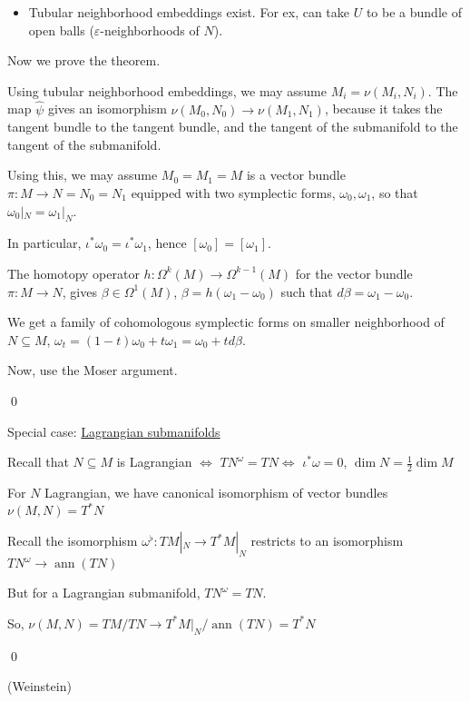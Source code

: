 \documentclass[x11names,reqno,14pt]{extarticle}
\DeclareMathOperator{\ann}{ann}
\begin{document}
\begin{itemize}

\item Tubular neighborhood embeddings exist. For ex, can take $U$ to be a bundle of open balls ($\varepsilon$-neighborhoods of $N$).

\end{itemize}

Now we prove the theorem. 

\proof

Using tubular neighborhood embeddings, we may assume $M_i = \nu(M_i,N_i)$. The map $\hat{\psi}$ gives an isomorphism $\nu(M_0,N_0) \to \nu(M_1,N_1)$, because it takes the tangent bundle to the tangent bundle, and the tangent of the submanifold to the tangent of the submanifold. 

Using this, we may assume $M_0 = M_1 = M$ is a vector bundle $\pi:M\to N = N_0 = N_1$ equipped with two symplectic forms, $\omega_0,\omega_1$, so that $\omega_0|_N = \omega_1|_N$.

In particular, $\iota^*\omega_0 = \iota^*\omega_1$, hence $[\omega_0] = [\omega_1]$. 

The homotopy operator $h:\Omega^k(M) \to \Omega^{k-1}(M)$ for the vector bundle $\pi:M\to N$, gives $\beta\in\Omega^1(M)$, $\beta = h(\omega_1-\omega_0)$ such that $d\beta = \omega_1-\omega_0$. 

We get a family of cohomologous symplectic forms on smaller neighborhood of $N\subseteq M$, $\omega_t = (1-t)\omega_0 + t\omega_1 = \omega_0 + td\beta$.

Now, use the Moser argument.

\qed

Special case: \underline{Lagrangian submanifolds}

Recall that $N \subseteq M$ is Lagrangian $\iff$ $TN^\omega = TN \iff$ $\iota^*\omega = 0$, $\dim N = \frac12\dim M$

\lem

For $N$ Lagrangian, we have canonical isomorphism of vector bundles $\nu(M,N) = T^*N$

\proof

Recall the isomorphism $\omega^\flat:TM|_N\to T^*M|_N$ restricts to an isomorphism $TN^\omega \to \ann(TN)$

But for a Lagrangian submanifold, $TN^\omega=TN$.

So, $\nu(M,N) = TM/TN \to T^*M|_N/\ann(TN) = T^*N$

\qed

\thm(Weinstein)
\end{document}
